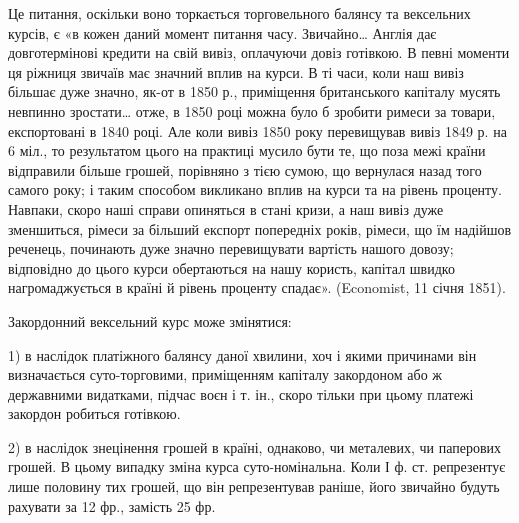 Це питання, оскільки воно торкається торговельного балянсу та вексельних
курсів, є «в кожен даний момент питання часу. Звичайно\dots{} Англія дає
довготермінові кредити на свій вивіз, оплачуючи довіз готівкою. В певні моменти
ця ріжниця звичаїв має значний вплив на курси. В ті часи, коли наш
вивіз більшає дуже значно, як-от в 1850 р., приміщення британського капіталу
мусять невпинно зростати\dots{} отже, в 1850 році можна було б зробити римеси
за товари, експортовані в 1840 році. Але коли вивіз 1850 року перевищував
вивіз 1849 р. на 6 міл., то результатом цього на практиці мусило бути те, що
поза межі країни відправили більше грошей, порівняно з тією сумою, що вернулася
назад того самого року; і таким способом викликано вплив на курси
та на рівень проценту. Навпаки, скоро наші справи опиняться в стані кризи,
а наш вивіз дуже зменшиться, рімеси за більший експорт попередніх років, рімеси,
що їм надійшов реченець, починають дуже значно перевищувати вартість нашого
довозу; відповідно до цього курси обертаються на нашу користь, капітал швидко
нагромаджується в країні й рівень проценту спадає». (Economist, 11 січня 1851).

Закордонний вексельний курс може змінятися:

1) в наслідок платіжного балянсу даної хвилини, хоч і якими причинами він
визначається суто-торговими, приміщенням капіталу закордоном або ж державними
видатками, підчас воєн і т. ін., скоро тільки при цьому платежі закордон
робиться готівкою.

2) в наслідок знецінення грошей в країні, однаково, чи металевих, чи
паперових грошей. В цьому випадку зміна курса суто-номінальна. Коли І ф. ст.
репрезентує лише половину тих грошей, що він репрезентував раніше, його
звичайно будуть рахувати за 12 фр., замість 25 фр.
